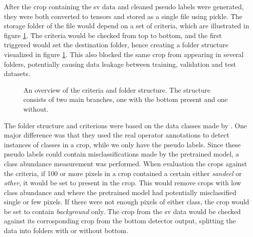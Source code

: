         After the crop containing the \gls{sv} data and cleaned pseudo labels were generated, they were both converted to tensors and stored as a single file using pickle. The storage folder of the file would depend on a set of criteria, which are illustrated in figure \ref{data_hierarchy_fig}. The criteria would be checked from top to bottom, and the first triggered would set the destination folder, hence creating a folder structure visualized in figure \ref{data_hierarchy_fig}. This also blocked the same crop from appearing in several folders, potentially causing data leakage between training, validation and test datasets.
        
        
        \begin{figure}[H]
            \centering
            
            


            \caption[Criteria and folder structure]{An overview of the criteria and folder structure. The structure consists of two main branches, one with the bottom present and one without.}
            
            
          	\medskip 
            \label{data_hierarchy_fig}
        \end{figure}
        

        
        The folder structure and criterions were based on the data classes made by \citeauthor{brautaset2020acoustic}\cite{brautaset2020acoustic}. One major difference was that they used the real operator annotations to detect instances of classes in a crop, while we only have the pseudo labels. Since these pseudo labels could contain misclassifications made by the pretrained model, a class abundance measurement was performed. When evaluation the crops against the criteria, if 100 or more pixels in a crop contained a certain either \textit{sandeel} or \textit{other}, it would be set to present in the crop. This would remove crops with low class abundance and where the pretrained model had potentially misclassified single or few pixels. If there were not enough pixels of either class, the crop would be set to contain \textit{background} only. The crop from the \gls{sv} data would be checked against its corrosponding crop from the bottom detector output, splitting the data into folders with or without bottom.
        

